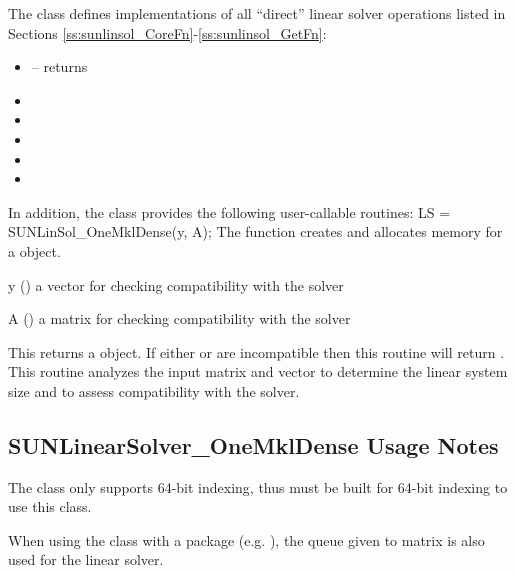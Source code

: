 The  class defines implementations of
all ``direct'' linear solver operations listed in
Sections \ref{ss:sunlinsol_CoreFn}-\ref{ss:sunlinsol_GetFn}:
\begin{itemize}
\item {} -- returns 
\item {}
\item {}
\item {}
\item {}
\item {}
\end{itemize}
In addition, the class provides the following user-callable routines:
{
  LS = SUNLinSol\_OneMklDense(y, A);
}
{
  The function  creates and allocates memory for a
  {\sunlinsol} object.
}
{
  \begin{args}[A]
  \item[y] ()
    a vector for checking compatibility with the solver
  \item[A] ()
    a  matrix for checking compatibility with the solver
  \end{args}
}
{
  This returns a  object.  If either  or
   are incompatible then this routine will return .
}
{
  This routine analyzes the input matrix and vector to determine the
  linear system size and to assess compatibility with the solver.
}

\subsection{SUNLinearSolver\_OneMklDense Usage Notes}
\label{ss:sunmat_OneMkldense_notes}

The  class only supports 64-bit indexing, thus
{\sundials} must be built for 64-bit indexing to use this class.

When using the  class with a {\sundials}
package (e.g. {\cvode}), the queue given to matrix is also used for the linear
solver.

